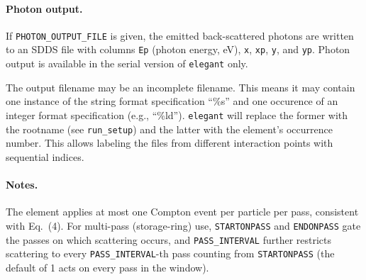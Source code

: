 \paragraph{Photon output.}
If \verb|PHOTON_OUTPUT_FILE| is given, the emitted back-scattered photons are
written to an SDDS file with columns \verb|Ep| (photon energy, eV), \verb|x|,
\verb|xp|, \verb|y|, and \verb|yp|.  Photon output is available in the serial
version of {\tt elegant} only.

The output filename may be an incomplete filename.  This means it may contain one instance of the string format
specification ``\%s'' and one occurence of an integer format specification (e.g., ``\%ld'').  {\tt elegant} will replace
the former with the rootname (see \verb|run_setup|) and the latter with the element's occurrence number.
This allows labeling the files from different interaction points with sequential indices.

\paragraph{Notes.}
The element applies at most one Compton event per particle per pass, consistent
with Eq.~(4).  For multi-pass (storage-ring) use, \verb|STARTONPASS| and
\verb|ENDONPASS| gate the passes on which scattering occurs, and
\verb|PASS_INTERVAL| further restricts scattering to every \verb|PASS_INTERVAL|-th
pass counting from \verb|STARTONPASS| (the default of 1 acts on every pass in the
window).

